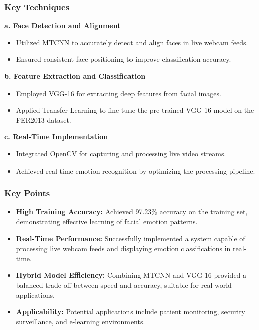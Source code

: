 \documentclass{article}
\begin{document}
\subsubsection*{Key Techniques}
\textbf{a. Face Detection and Alignment}
\begin{itemize}
    \item Utilized MTCNN to accurately detect and align faces in live webcam feeds.
    \item Ensured consistent face positioning to improve classification accuracy.
\end{itemize}

\textbf{b. Feature Extraction and Classification}
\begin{itemize}
    \item Employed VGG-16 for extracting deep features from facial images.
    \item Applied Transfer Learning to fine-tune the pre-trained VGG-16 model on the FER2013 dataset.
\end{itemize}

\textbf{c. Real-Time Implementation}
\begin{itemize}
    \item Integrated OpenCV for capturing and processing live video streams.
    \item Achieved real-time emotion recognition by optimizing the processing pipeline.
\end{itemize}

\subsubsection*{Key Points}
\begin{itemize}
    \item \textbf{High Training Accuracy:} Achieved 97.23\% accuracy on the training set, demonstrating effective learning of facial emotion patterns.
    \item \textbf{Real-Time Performance:} Successfully implemented a system capable of processing live webcam feeds and displaying emotion classifications in real-time.
    \item \textbf{Hybrid Model Efficiency:} Combining MTCNN and VGG-16 provided a balanced trade-off between speed and accuracy, suitable for real-world applications.
    \item \textbf{Applicability:} Potential applications include patient monitoring, security surveillance, and e-learning environments.
\end{itemize}
\end{document}
